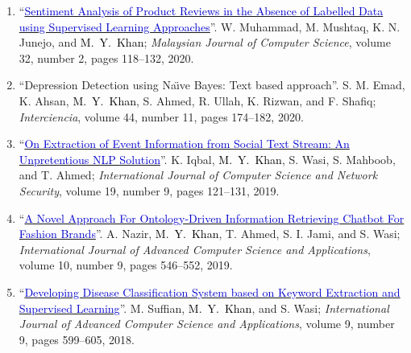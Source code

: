\documentclass[a4paper, 10pt]{article}
\begin{document}
\begin{enumerate}
\item ``\href{https://doi.org/10.22452/mjcs.vol33no2.3}{\textcolor{MediumBlue}{Sentiment Analysis of Product Reviews in the Absence of Labelled Data using Supervised Learning Approaches}}''. W. Muhammad, M. Mushtaq, K. N. Junejo, and \textcolor{Black}{M.~Y.~Khan}; \emph{Malaysian Journal of Computer Science}, volume 32, number 2, pages 118--132, 2020. \qthreetag{\textcolor{white}{\textsf\bfseries Q3}}  

\item ``Depression Detection using Na\"{\i}ve Bayes: Text based approach''. S. M. Emad, K. Ahsan, \textcolor{Black}{M.~Y.~Khan}, S. Ahmed, R. Ullah, K. Rizwan, and F. Shafiq; \emph{Interciencia}, volume 44, number 11, pages 174--182, 2020. \qtwotag{\textcolor{white}{\textsf\bfseries Q2}}  

\item ``\href{http://paper.ijcsns.org/07_book/201909/20190915.pdf}{\textcolor{MediumBlue}{On Extraction of Event Information from Social Text Stream: An Unpretentious NLP Solution}}''. K. Iqbal, \textcolor{Black}{M.~Y.~Khan}, S. Wasi, S. Mahboob, and T. Ahmed; \emph{International Journal of Computer Science and Network Security}, volume 19, number 9, pages 121--131, 2019.  

\item ``\href{https://doi.org/10.14569/IJACSA.2019.0100972}{\textcolor{MediumBlue}{A Novel Approach For Ontology-Driven Information Retrieving Chatbot For Fashion Brands}}''. A. Nazir, \textcolor{Black}{M.~Y.~Khan}, T. Ahmed, S. I. Jami, and S. Wasi; \emph{International Journal of Advanced Computer Science and Applications}, volume 10, number 9, pages 546--552, 2019. \qthreetag{\textcolor{white}{\textsf\bfseries Q3}} 

\item ``\href{https://doi.org/10.14569/IJACSA.2018.090976}{\textcolor{MediumBlue}{Developing Disease Classification System based on Keyword Extraction and Supervised Learning}}''. M. Suffian, \textcolor{Black}{M.~Y.~Khan}, and S. Wasi; \emph{International Journal of Advanced Computer Science and Applications}, volume 9, number 9, pages 599--605, 2018. %
\end{enumerate}
\end{document}

